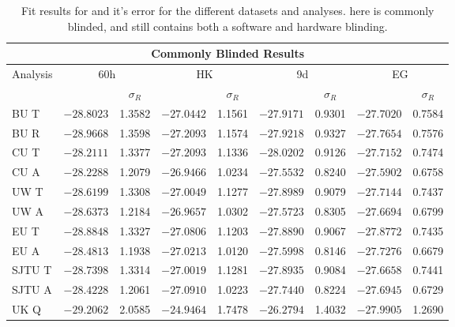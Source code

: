 \begin{table}
\small
\centering
\renewcommand{\arraystretch}{1.2}
\begin{tabularx}{1\linewidth}{@{\extracolsep{\fill}}lcccccccc}
  \toprule
  	\multicolumn{9}{c}{{\normalsize \Rone Commonly Blinded Results }} \\
  \midrule
  	\multirow{2}{*}{Analysis} & \multicolumn{2}{c}{60h} & \multicolumn{2}{c}{HK} & \multicolumn{2}{c}{9d} & \multicolumn{2}{c}{EG} \\ \cmidrule{2-3} \cmidrule{4-5} \cmidrule{6-7} \cmidrule{8-9}
  			 & \R & $\sigma_{R}$ & \R & $\sigma_{R}$ & \R & $\sigma_{R}$ & \R & $\sigma_{R}$ \\
  \midrule
	BU T   & $-28.8023$ & 1.3582 & $-27.0442$ & 1.1561 & $-27.9171$ & 0.9301 & $-27.7020$ & 0.7584 \\
	BU R   & $-28.9668$ & 1.3598 & $-27.2093$ & 1.1574 & $-27.9218$ & 0.9327 & $-27.7654$ & 0.7576 \\
	CU T   & $-28.2111$ & 1.3377 & $-27.2093$ & 1.1336 & $-28.0202$ & 0.9126 & $-27.7152$ & 0.7474 \\
	CU A   & $-28.2288$ & 1.2079 & $-26.9466$ & 1.0234 & $-27.5532$ & 0.8240 & $-27.5902$ & 0.6758 \\
	UW T   & $-28.6199$ & 1.3308 & $-27.0049$ & 1.1277 & $-27.8989$ & 0.9079 & $-27.7144$ & 0.7437 \\
	UW A   & $-28.6373$ & 1.2184 & $-26.9657$ & 1.0302 & $-27.5723$ & 0.8305 & $-27.6694$ & 0.6799 \\
	EU T   & $-28.8848$ & 1.3327 & $-27.0806$ & 1.1203 & $-27.8890$ & 0.9067 & $-27.8772$ & 0.7435 \\
	EU A   & $-28.4813$ & 1.1938 & $-27.0213$ & 1.0120 & $-27.5998$ & 0.8146 & $-27.7276$ & 0.6679 \\
	SJTU T & $-28.7398$ & 1.3314 & $-27.0019$ & 1.1281 & $-27.8935$ & 0.9084 & $-27.6658$ & 0.7441 \\
	SJTU A & $-28.4228$ & 1.2061 & $-27.0910$ & 1.0223 & $-27.7440$ & 0.8224 & $-27.6945$ & 0.6729 \\
	UK Q   & $-29.2062$ & 2.0585 & $-24.9464$ & 1.7478 & $-26.2794$ & 1.4032 & $-27.9905$ & 1.2690 \\
  \bottomrule
\end{tabularx}
\caption[]{Fit results for \R and it's error for the different \Rone datasets and analyses. \R here is commonly blinded, and still contains both a software and hardware blinding.}
\label{tab:analysisRValues}
\end{table}





